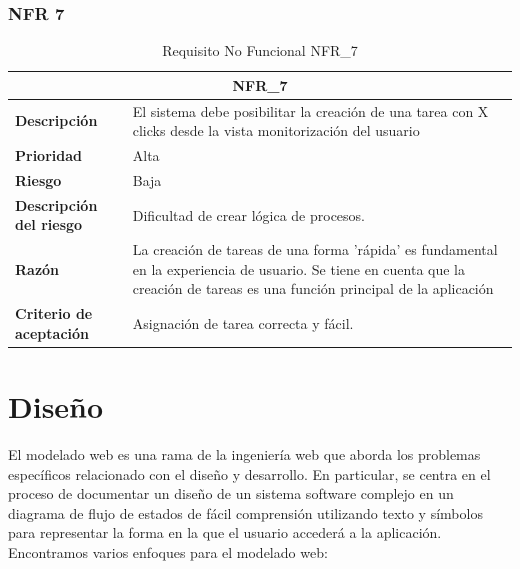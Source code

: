 \documentclass{scrreprt}
\begin{document}
\subsection{NFR 7}
    \begin{table}[H]
        \label{tab:my-table}
        \begin{tabular}{|p{5cm}|p{11cm}|}
        \hline
        \multicolumn{2}{|c|}{\textbf{NFR_7}} \\
        \hline
        \textbf{Descripción  }                      &  El sistema debe posibilitar la creación de una tarea con X clicks desde la vista monitorización del usuario                                                                      \\ \hline
        \textbf{Prioridad}                          & Alta                                                                                              \\ \hline
        \textbf{Riesgo}                          & Baja                                                                                                \\ \hline
        \textbf{Descripción del riesgo}                    &  Dificultad de crear lógica de procesos.                          \\ \hline
        \textbf{Razón}                   & La creación de tareas de una forma 'rápida' es fundamental en la experiencia de usuario. Se tiene en cuenta que la creación de tareas es una función principal de la aplicación                                                                                        \\ \hline
         \textbf{Criterio de aceptación}                    & Asignación de tarea correcta y fácil.  \\ \hline
        \end{tabular}%
        
        \caption{Requisito No Funcional NFR_7}
\end{table}

\chapter{Diseño}

El modelado web es una rama de la ingeniería web que aborda los problemas específicos relacionado con el diseño y desarrollo. En particular, se centra en el proceso de documentar un diseño de un sistema software complejo en un diagrama de flujo de estados de fácil comprensión utilizando texto y símbolos para representar la forma en la que el usuario accederá a la aplicación. Encontramos varios enfoques para el modelado web:
\end{document}
